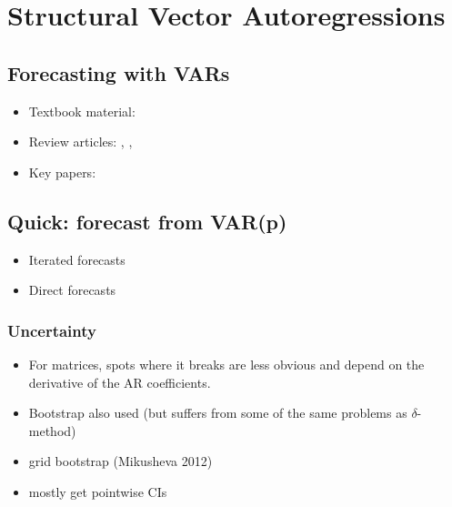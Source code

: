 

\section{Structural Vector Autoregressions}

\subsection{Forecasting with VARs}

\begin{itemize}
\item Textbook material: \citet[Chapter 20]{Gr12}
\item Review articles: \citet{Ki13}, \citet{Wa94},
\item Key papers: \citet{Si80}
\end{itemize}

\subsection{Quick: forecast from VAR(p)}

\begin{itemize}
\item Iterated forecasts
\item Direct forecasts
\end{itemize}

\subsubsection{Uncertainty}

\begin{itemize}
\item For matrices, spots where it breaks are less obvious and depend
  on the derivative of the AR coefficients.
\item Bootstrap also used (but suffers from some of the same problems
  as $\delta$-method)
\item grid bootstrap (Mikusheva 2012)
\item mostly get pointwise CIs
\end{itemize}

